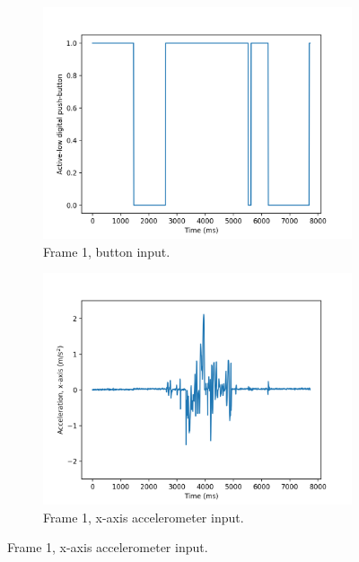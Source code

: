 \documentclass[12pt]{article}
\begin{document}
\begin{figure}[ht]
\centering

\begin{subfigure}[b]{.45\linewidth}
\includegraphics[width=\linewidth]{f0-button.png}
\caption{Frame 1, button input.}
\end{subfigure}
\begin{subfigure}[b]{.45\linewidth}
\includegraphics[width=\linewidth]{f0-acc.png}
\caption{Frame 1, x-axis accelerometer input.}
\end{subfigure}


\end{figure}
\end{document}
